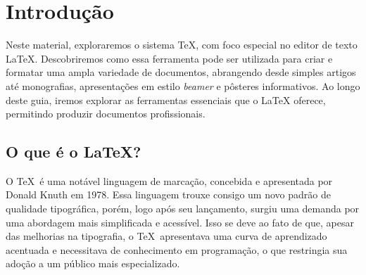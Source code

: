 %
%
%
\chapter{Introdu\c c\~ao}
\label{intro} %


Neste material, exploraremos o sistema TeX, com foco especial no editor de texto \LaTeX. Descobriremos como essa ferramenta pode ser utilizada para criar e formatar uma ampla variedade de documentos, abrangendo desde simples artigos até monografias, apresentações em estilo \emph{beamer} e pôsteres informativos. Ao longo deste guia, iremos explorar as ferramentas essenciais que o \LaTeX{} oferece, permitindo produzir documentos profissionais.

\section{O que \'e o LaTeX?}
\label{sec:1}

O \TeX\ é uma not\'avel linguagem de marcação, concebida e apresentada por Donald Knuth em 1978. Essa linguagem trouxe consigo um novo padrão de qualidade tipográfica, porém, logo após seu lançamento, surgiu uma demanda por uma abordagem mais simplificada e acessível. Isso se deve ao fato de que, apesar das melhorias na tipografia, o \TeX\ apresentava uma curva de aprendizado acentuada e necessitava de conhecimento em programação, o que restringia sua adoção a um público mais especializado.

